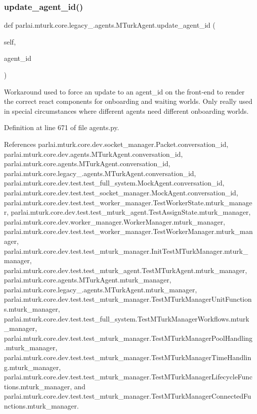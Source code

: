 \subsubsection{\texorpdfstring{update\+\_\+agent\+\_\+id()}{update\_agent\_id()}}
{\footnotesize\ttfamily def parlai.\+mturk.\+core.\+legacy\+\_.\+agents.\+M\+Turk\+Agent.\+update\+\_\+agent\+\_\+id (\begin{DoxyParamCaption}\item[{}]{self,  }\item[{}]{agent\+\_\+id }\end{DoxyParamCaption})}

\begin{DoxyVerb}Workaround used to force an update to an agent_id on the front-end
to render the correct react components for onboarding and waiting
worlds. Only really used in special circumstances where different
agents need different onboarding worlds.
\end{DoxyVerb}
 

Definition at line 671 of file agents.\+py.



References parlai.\+mturk.\+core.\+dev.\+socket\+\_\+manager.\+Packet.\+conversation\+\_\+id, parlai.\+mturk.\+core.\+dev.\+agents.\+M\+Turk\+Agent.\+conversation\+\_\+id, parlai.\+mturk.\+core.\+agents.\+M\+Turk\+Agent.\+conversation\+\_\+id, parlai.\+mturk.\+core.\+legacy\+\_.\+agents.\+M\+Turk\+Agent.\+conversation\+\_\+id, parlai.\+mturk.\+core.\+dev.\+test.\+test\+\_\+full\+\_\+system.\+Mock\+Agent.\+conversation\+\_\+id, parlai.\+mturk.\+core.\+dev.\+test.\+test\+\_\+socket\+\_\+manager.\+Mock\+Agent.\+conversation\+\_\+id, parlai.\+mturk.\+core.\+dev.\+test.\+test\+\_\+worker\+\_\+manager.\+Test\+Worker\+State.\+mturk\+\_\+manager, parlai.\+mturk.\+core.\+dev.\+test.\+test\+\_\+mturk\+\_\+agent.\+Test\+Assign\+State.\+mturk\+\_\+manager, parlai.\+mturk.\+core.\+dev.\+worker\+\_\+manager.\+Worker\+Manager.\+mturk\+\_\+manager, parlai.\+mturk.\+core.\+dev.\+test.\+test\+\_\+worker\+\_\+manager.\+Test\+Worker\+Manager.\+mturk\+\_\+manager, parlai.\+mturk.\+core.\+dev.\+test.\+test\+\_\+mturk\+\_\+manager.\+Init\+Test\+M\+Turk\+Manager.\+mturk\+\_\+manager, parlai.\+mturk.\+core.\+dev.\+test.\+test\+\_\+mturk\+\_\+agent.\+Test\+M\+Turk\+Agent.\+mturk\+\_\+manager, parlai.\+mturk.\+core.\+agents.\+M\+Turk\+Agent.\+mturk\+\_\+manager, parlai.\+mturk.\+core.\+legacy\+\_.\+agents.\+M\+Turk\+Agent.\+mturk\+\_\+manager, parlai.\+mturk.\+core.\+dev.\+test.\+test\+\_\+mturk\+\_\+manager.\+Test\+M\+Turk\+Manager\+Unit\+Functions.\+mturk\+\_\+manager, parlai.\+mturk.\+core.\+dev.\+test.\+test\+\_\+full\+\_\+system.\+Test\+M\+Turk\+Manager\+Workflows.\+mturk\+\_\+manager, parlai.\+mturk.\+core.\+dev.\+test.\+test\+\_\+mturk\+\_\+manager.\+Test\+M\+Turk\+Manager\+Pool\+Handling.\+mturk\+\_\+manager, parlai.\+mturk.\+core.\+dev.\+test.\+test\+\_\+mturk\+\_\+manager.\+Test\+M\+Turk\+Manager\+Time\+Handling.\+mturk\+\_\+manager, parlai.\+mturk.\+core.\+dev.\+test.\+test\+\_\+mturk\+\_\+manager.\+Test\+M\+Turk\+Manager\+Lifecycle\+Functions.\+mturk\+\_\+manager, and parlai.\+mturk.\+core.\+dev.\+test.\+test\+\_\+mturk\+\_\+manager.\+Test\+M\+Turk\+Manager\+Connected\+Functions.\+mturk\+\_\+manager.

